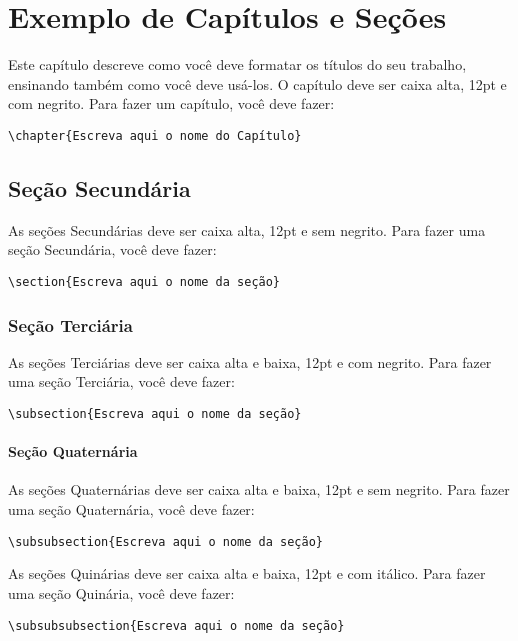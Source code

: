\chapter{Exemplo de Capítulos e Seções}
\label{chap:introducao}

Este capítulo descreve como você deve formatar os títulos do seu trabalho, ensinando também como você deve usá-los. O capítulo deve ser caixa alta, 12pt e com negrito. Para fazer um capítulo, você deve fazer:

\verb!\chapter{Escreva aqui o nome do Capítulo}!

\section{Seção Secundária}
As seções Secundárias deve ser caixa alta, 12pt e sem negrito. Para fazer uma seção Secundária, você deve fazer:

\verb!\section{Escreva aqui o nome da seção}!

\subsection{Seção Terciária}
As seções Terciárias deve ser caixa alta e baixa, 12pt e com negrito. Para fazer uma seção Terciária, você deve fazer:

\verb!\subsection{Escreva aqui o nome da seção}!

\subsubsection{Seção Quaternária}
As seções Quaternárias deve ser caixa alta e baixa, 12pt e sem negrito. Para fazer uma seção Quaternária, você deve fazer:

\verb!\subsubsection{Escreva aqui o nome da seção}!

As seções Quinárias deve ser caixa alta e baixa, 12pt e com itálico. Para fazer uma seção Quinária, você deve fazer:

\verb!\subsubsubsection{Escreva aqui o nome da seção}!